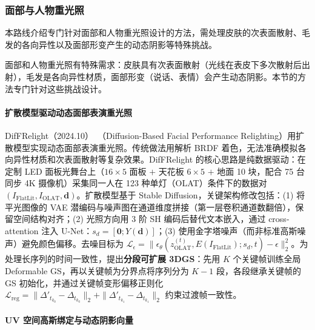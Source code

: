\subsubsection{面部与人物重光照}

本路线介绍专门针对面部和人物重光照设计的方法，需处理皮肤的次表面散射、毛发的各向异性以及面部形变产生的动态阴影等特殊挑战。

面部和人物重光照有特殊需求：皮肤具有次表面散射（光线在表皮下多次散射后出射），毛发是各向异性材质，面部形变（说话、表情）会产生动态阴影。本节的方法专门针对这些挑战设计。

\paragraph{扩散模型驱动动态面部表演重光照}

DifFRelight（2024.10）~\cite{2410_08188}（Diffusion-Based Facial Performance Relighting）用扩散模型实现动态面部表演重光照。传统做法用解析 BRDF 着色，无法准确模拟各向异性材质和次表面散射等复杂效果。DifFRelight 的核心思路是纯数据驱动：在定制 LED 面板光舞台上（$16 \times 5$ 面板 $+$ 天花板 $6 \times 5$ $+$ 地面 10 块，配合 75 台同步 4K 摄像机）采集同一人在 123 种单灯（OLAT）条件下的数据对 $(I_{\text{FlatLit}}, I_{\text{OLAT}}, \mathbf{d})$。扩散模型基于 Stable Diffusion，关键架构修改包括：(1) 将平光图像的 VAE 潜编码与噪声图在通道维度拼接（第一层卷积通道数翻倍），保留空间结构对齐；(2) 光照方向用 3 阶 SH 编码后替代文本嵌入，通过 cross-attention 注入 U-Net：$s_d = [\mathbf{0}; Y(\mathbf{d})]$；(3) 使用金字塔噪声（而非标准高斯噪声）避免颜色偏移。去噪目标为 $\mathcal{L}_\epsilon = \|\epsilon_\theta(z_{\text{OLAT}}^{(t)}, E(I_{\text{FlatLit}}); s_d, t) - \epsilon\|_2^2$。为处理长序列的时间一致性，提出\textbf{分段可扩展 3DGS}：先用 $K$ 个关键帧训练全局 Deformable GS，再以关键帧为分界点将序列分为 $K-1$ 段，各段继承关键帧的 GS 初始化，并通过关键帧变形偏移正则化 $\mathcal{L}_{\text{reg}} = \|\Delta'_{t_{k_0}} - \Delta_{t_{k_0}}\|_2 + \|\Delta'_{t_{k_1}} - \Delta_{t_{k_1}}\|_2$ 约束过渡帧一致性。

\paragraph{UV 空间高斯绑定与动态阴影向量}

